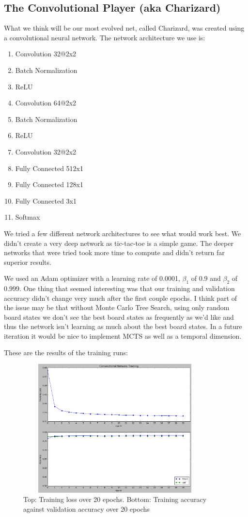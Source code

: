 
\subsection{The Convolutional Player (aka Charizard)}

What we think will be our most evolved net, called Charizard, was created using a convolutional neural network.
The network architecture we use is:
\begin{enumerate}
    \item Convolution 32@2x2
    \item Batch Normalization
    \item ReLU
    \item Convolution 64@2x2
    \item Batch Normalization
    \item ReLU
    \item Convolution 32@2x2
    \item Fully Connected 512x1
    \item Fully Connected 128x1
    \item Fully Connected 3x1
    \item Softmax
\end{enumerate}
We tried a few different network architectures to see what would work best. We didn't create a very deep network as tic-tac-toe is a simple game. The deeper networks that were tried took more time to compute and didn't return far superior results.

We used an Adam optimizer with a learning rate of 0.0001, $\beta_1$ of 0.9 and $\beta_2$ of 0.999. One thing that seemed interesting was that our training and validation accuracy didn't change very much after the first couple epochs. I think part of the issue may be that without Monte Carlo Tree Search, using only random board states we don't see the best board states as frequently as we'd like and thus the network isn't learning as much about the best board states. In a future iteration it would be nice to implement MCTS as well as a temporal dimension.

These are the results of the training runs:
\begin{figure}[h!]
	\centering
	\includegraphics[width=10cm, height=7cm]{convolutional-net-training.png}
	\caption{Top: Training loss over 20 epochs. Bottom: Training accuracy against validation accuracy over 20 epochs}
	\label{fig:conv_net}
\end{figure}
